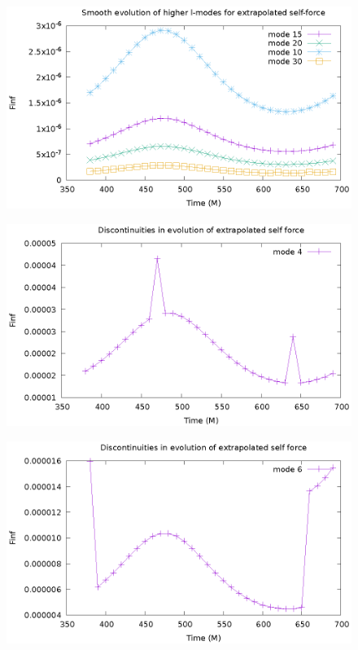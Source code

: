 \documentclass{article}
\begin{document}
\begin{figure}
\includegraphics{finfOverTimeHighL}
\end{figure}
\begin{figure}
\includegraphics{finfOverTimeL4}
\end{figure}
\begin{figure}
\includegraphics{finfOverTimeL6}
\end{figure}
\end{document}
